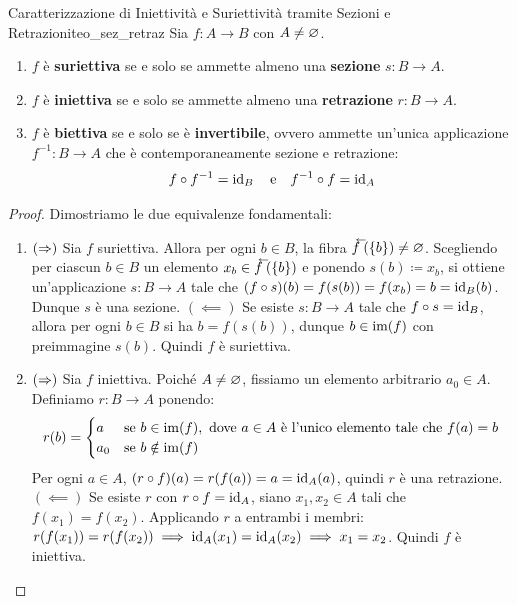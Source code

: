 \begin{teorema}{Caratterizzazione di Iniettività e Suriettività tramite Sezioni e Retrazioni}{teo_sez_retraz}
Sia $f: A \to B$ con $A \neq \varnothing$.
\begin{enumerate}
    \item $f$ è \textbf{suriettiva} se e solo se ammette almeno una \textbf{sezione} $s: B \to A$.
    \item $f$ è \textbf{iniettiva} se e solo se ammette almeno una \textbf{retrazione} $r: B \to A$.
    \item $f$ è \textbf{biettiva} se e solo se è \textbf{invertibile}, ovvero ammette un'unica applicazione $f^{-1}: B \to A$ che è contemporaneamente sezione e retrazione:
    \[
        f \circ f^{-1} = \operatorname{id}_B \quad \text{e} \quad f^{-1} \circ f = \operatorname{id}_A
    \]
\end{enumerate}
\end{teorema}

\begin{proof}
Dimostriamo le due equivalenze fondamentali:
\begin{enumerate}
    \item $(\Rightarrow)$ Sia $f$ suriettiva. Allora per ogni $b \in B$, la fibra $\antivecf(\{b\}) \neq \vuoto$. Scegliendo per ciascun $b \in B$ un elemento $x_b \in \antivecf(\{b\})$ e ponendo $s(b) \coloneqq x_b$, si ottiene un'applicazione $s: B \to A$ tale che $(f \circ s)(b) = f(s(b)) = f(x_b) = b = \operatorname{id}_B(b)$. Dunque $s$ è una sezione.
    $(\impliedby)$ Se esiste $s: B \to A$ tale che $f \circ s = \operatorname{id}_B$, allora per ogni $b \in B$ si ha $b = f(s(b))$, dunque $b \in \operatorname{im}(f)$ con preimmagine $s(b)$. Quindi $f$ è suriettiva.
    \item $(\Rightarrow)$ Sia $f$ iniettiva. Poiché $A \neq \varnothing$, fissiamo un elemento arbitrario $a_0 \in A$. Definiamo $r: B \to A$ ponendo:
    \[
        r(b) = \begin{cases}
            a & \text{se } b \in \operatorname{im}(f), \text{ dove } a \in A \text{ è l'unico elemento tale che } f(a) = b \\
            a_0 & \text{se } b \notin \operatorname{im}(f)
        \end{cases}
    \]
    Per ogni $a \in A$, $(r \circ f)(a) = r(f(a)) = a = \operatorname{id}_A(a)$, quindi $r$ è una retrazione.
    $(\impliedby)$ Se esiste $r$ con $r \circ f = \operatorname{id}_A$, siano $x_1, x_2 \in A$ tali che $f(x_1) = f(x_2)$. Applicando $r$ a entrambi i membri: $r(f(x_1)) = r(f(x_2)) \implies \operatorname{id}_A(x_1) = \operatorname{id}_A(x_2) \implies x_1 = x_2$. Quindi $f$ è iniettiva.
\end{enumerate}
\end{proof}

